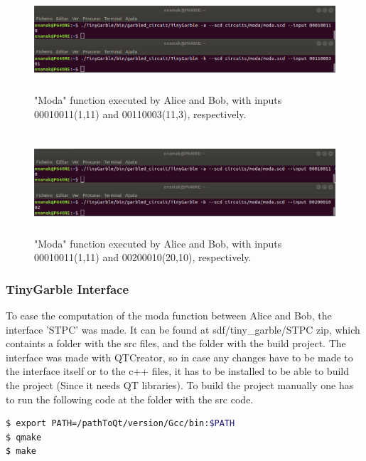 \begin{refsection}
\begin{figure}[H]
	\centering
	\includegraphics[width=1\textwidth, height=3.8cm]{./sdf/tiny_garble/figures/tinygarble_moda_1.png}
    \caption{"Moda" function executed by Alice and Bob, with inputs 00010011(1,11) and 00110003(11,3), respectively.}\label{fig:tinygarble_moda_1}
\end{figure}

\begin{figure}[H]
	\centering
	\includegraphics[width=1\textwidth, height=3.8cm]{./sdf/tiny_garble/figures/tinygarble_moda_2.png}
    \caption{"Moda" function executed by Alice and Bob, with inputs 00010011(1,11) and 00200010(20,10), respectively.}\label{fig:tinygarble_moda_2}
\end{figure}

\newpage
\subsubsection{TinyGarble Interface}

To ease the computation of the moda function between Alice and Bob, the interface 'STPC' was made. It can be found at sdf/tiny\_garble/STPC zip, which containts a folder with the src files, and the folder with the build project. The interface was made with QTCreator, so in case any changes have to be made to the interface itself or to the c++ files, it has to be installed to be able to build the project (Since it needs QT libraries). To build the project manually one has to run the following code at the folder with the src code.

\begin{lstlisting}[caption={Manually building QT application}, language=bash, captionpos=b]
$ export PATH=/pathToQt/version/Gcc/bin:$PATH
$ qmake
$ make
\end{lstlisting}


\end{refsection}
